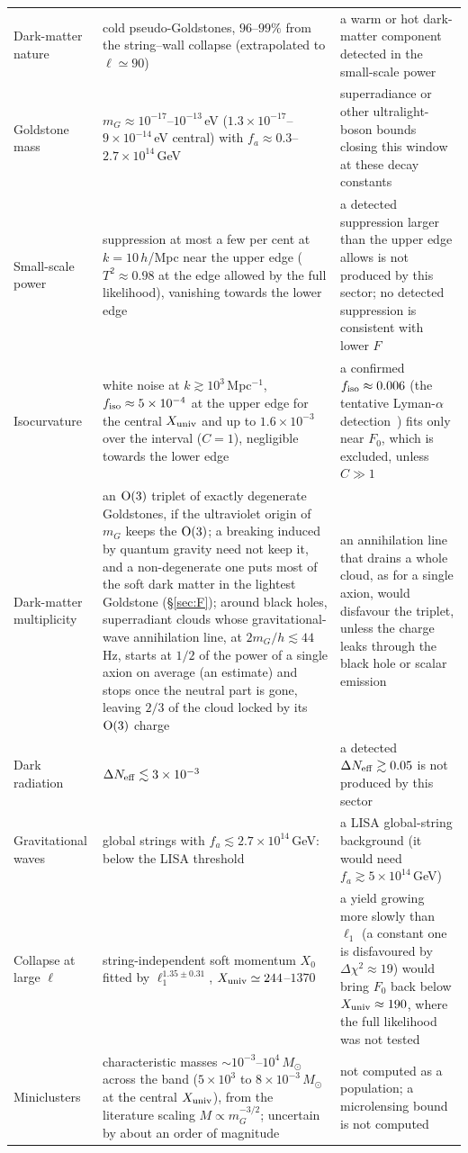 \documentclass[11pt,a4paper]{article}
\newcommand{\Xu}{X_{\rm univ}}
\begin{document}
\begin{longtable}{L{3.0cm}L{5.4cm}L{5.6cm}}
Dark-matter nature & cold pseudo-Goldstones, $96$--$99\%$ from the string--wall collapse (extrapolated to $\ell\simeq90$) & a warm or hot dark-matter component detected in the small-scale power\\
Goldstone mass & $m_G\approx10^{-17}$--$10^{-13}$\,eV ($1.3\times10^{-17}$--$9\times10^{-14}$\,eV central) with $f_a\approx0.3$--$2.7\times10^{14}$\,GeV & superradiance or other ultralight-boson bounds closing this window at these decay constants\\
Small-scale power & suppression at most a few per cent at $k=10\,h$/Mpc near the upper edge ($T^2\approx0.98$ at the edge allowed by the full likelihood), vanishing towards the lower edge & a detected suppression larger than the upper edge allows is not produced by this sector; no detected suppression is consistent with lower $F$\\
Isocurvature & white noise at $k\gtrsim10^3$\,Mpc$^{-1}$, $f_{\rm iso}\approx5\times10^{-4}$ at the upper edge for the central $\Xu$ and up to $1.6\times10^{-3}$ over the interval ($C=1$), negligible towards the lower edge & a confirmed $f_{\rm iso}\approx0.006$ (the tentative Lyman-$\alpha$ detection~\cite{GarciaGallego2026}) fits only near $F_0$, which is excluded, unless $C\gg1$\\
Dark-matter multiplicity & an ${\rm O}(3)$ triplet of exactly degenerate Goldstones, if the ultraviolet origin of $m_G$ keeps the ${\rm O}(3)$; a breaking induced by quantum gravity need not keep it, and a non-degenerate one puts most of the soft dark matter in the lightest Goldstone (\S\ref{sec:F}); around black holes, superradiant clouds whose gravitational-wave annihilation line, at $2m_G/h\lesssim44$\,Hz, starts at $1/2$ of the power of a single axion on average (an estimate) and stops once the neutral part is gone, leaving $2/3$ of the cloud locked by its ${\rm O}(3)$ charge & an annihilation line that drains a whole cloud, as for a single axion, would disfavour the triplet, unless the charge leaks through the black hole or scalar emission\\
Dark radiation & $\Delta N_{\rm eff}\lesssim3\times10^{-3}$ & a detected $\Delta N_{\rm eff}\gtrsim0.05$ is not produced by this sector\\
Gravitational waves & global strings with $f_a\lesssim2.7\times10^{14}$\,GeV: below the LISA threshold~\cite{GHN2021} & a LISA global-string background (it would need $f_a\gtrsim5\times10^{14}$\,GeV)\\
Collapse at large $\ell$ & string-independent soft momentum $X_0$ fitted by $\ell_1^{1.35\pm0.31}$, $\Xu\simeq244$--$1370$ & a yield growing more slowly than $\ell_1$ (a constant one is disfavoured by $\Delta\chi^2\approx19$) would bring $F_0$ back below $\Xu\approx190$, where the full likelihood was not tested\\
Miniclusters & characteristic masses $\sim10^{-3}$--$10^{4}\,M_\odot$ across the band ($5\times10^3$ to $8\times10^{-3}\,M_\odot$ at the central $\Xu$), from the literature scaling $M\propto m_G^{-3/2}$; uncertain by about an order of magnitude & not computed as a population; a microlensing bound is not computed\\
\end{longtable}
\end{document}

